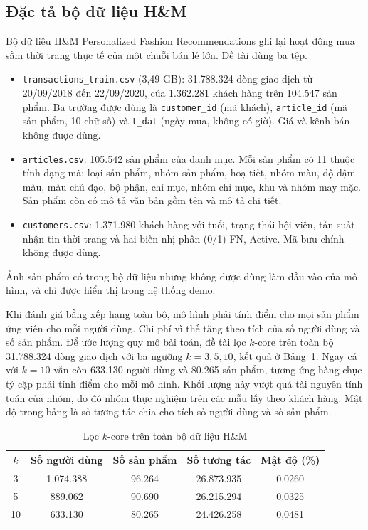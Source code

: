 \subsection{Đặc tả bộ dữ liệu H\&M}
\label{subsec:hm_description}

Bộ dữ liệu H\&M Personalized Fashion Recommendations \parencite{hm2022kaggle} ghi lại hoạt động mua sắm thời trang thực tế của một chuỗi bán lẻ lớn. Đề tài dùng ba tệp.
\begin{itemize}
    \item \texttt{transactions\_train.csv} (3,49 GB): 31.788.324 dòng giao dịch từ 20/09/2018 đến 22/09/2020, của 1.362.281 khách hàng trên 104.547 sản phẩm. Ba trường được dùng là \texttt{customer\_id} (mã khách), \texttt{article\_id} (mã sản phẩm, 10 chữ số) và \texttt{t\_dat} (ngày mua, không có giờ). Giá và kênh bán không được dùng.
    \item \texttt{articles.csv}: 105.542 sản phẩm của danh mục. Mỗi sản phẩm có 11 thuộc tính dạng mã: loại sản phẩm, nhóm sản phẩm, hoạ tiết, nhóm màu, độ đậm màu, màu chủ đạo, bộ phận, chỉ mục, nhóm chỉ mục, khu và nhóm may mặc. Sản phẩm còn có mô tả văn bản gồm tên và mô tả chi tiết.
    \item \texttt{customers.csv}: 1.371.980 khách hàng với tuổi, trạng thái hội viên, tần suất nhận tin thời trang và hai biến nhị phân (0/1) FN, Active. Mã bưu chính không được dùng.
\end{itemize}

Ảnh sản phẩm có trong bộ dữ liệu nhưng không được dùng làm đầu vào của mô hình, và chỉ được hiển thị trong hệ thống demo.

Khi đánh giá bằng xếp hạng toàn bộ, mô hình phải tính điểm cho mọi sản phẩm ứng viên cho mỗi người dùng. Chi phí vì thế tăng theo tích của số người dùng và số sản phẩm. Để ước lượng quy mô bài toán, đề tài lọc $k$-core trên toàn bộ 31.788.324 dòng giao dịch với ba ngưỡng $k = 3, 5, 10$, kết quả ở Bảng~\ref{tab:kcore_hm_full}. Ngay cả với $k = 10$ vẫn còn 633.130 người dùng và 80.265 sản phẩm, tương ứng hàng chục tỷ cặp phải tính điểm cho mỗi mô hình. Khối lượng này vượt quá tài nguyên tính toán của nhóm, do đó nhóm thực nghiệm trên các mẫu lấy theo khách hàng. Mật độ trong bảng là số tương tác chia cho tích số người dùng và số sản phẩm.

\begin{table}[H]
    \centering\small
    \caption{Lọc $k$-core trên toàn bộ dữ liệu H\&M}
    \label{tab:kcore_hm_full}
    \begin{tabular}{|c|c|c|c|c|}
        \hline
        $k$ & Số người dùng & Số sản phẩm & Số tương tác & Mật độ (\%) \\
        \hline
        3 & 1.074.388 & 96.264 & 26.873.935 & 0,0260 \\ \hline
        5 & 889.062 & 90.690 & 26.215.294 & 0,0325 \\ \hline
        10 & 633.130 & 80.265 & 24.426.258 & 0,0481 \\
        \hline
    \end{tabular}
\end{table}

